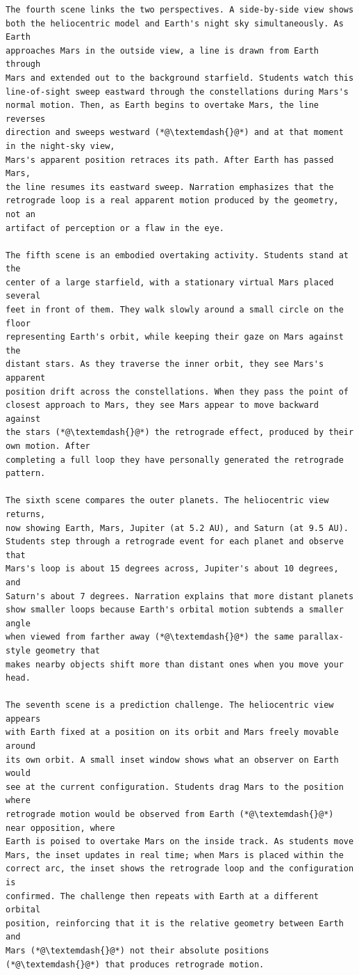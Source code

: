 \begin{lstlisting}[style=arlemlisting, caption={Complete Script-level JSON Lab input for \emph{Apparent Retrograde Motion}: system prompt, then user prompt.}, label={lst:example-prompt}]
The fourth scene links the two perspectives. A side-by-side view shows
both the heliocentric model and Earth's night sky simultaneously. As Earth
approaches Mars in the outside view, a line is drawn from Earth through
Mars and extended out to the background starfield. Students watch this
line-of-sight sweep eastward through the constellations during Mars's
normal motion. Then, as Earth begins to overtake Mars, the line reverses
direction and sweeps westward (*@\textemdash{}@*) and at that moment in the night-sky view,
Mars's apparent position retraces its path. After Earth has passed Mars,
the line resumes its eastward sweep. Narration emphasizes that the
retrograde loop is a real apparent motion produced by the geometry, not an
artifact of perception or a flaw in the eye.

The fifth scene is an embodied overtaking activity. Students stand at the
center of a large starfield, with a stationary virtual Mars placed several
feet in front of them. They walk slowly around a small circle on the floor
representing Earth's orbit, while keeping their gaze on Mars against the
distant stars. As they traverse the inner orbit, they see Mars's apparent
position drift across the constellations. When they pass the point of
closest approach to Mars, they see Mars appear to move backward against
the stars (*@\textemdash{}@*) the retrograde effect, produced by their own motion. After
completing a full loop they have personally generated the retrograde
pattern.

The sixth scene compares the outer planets. The heliocentric view returns,
now showing Earth, Mars, Jupiter (at 5.2 AU), and Saturn (at 9.5 AU).
Students step through a retrograde event for each planet and observe that
Mars's loop is about 15 degrees across, Jupiter's about 10 degrees, and
Saturn's about 7 degrees. Narration explains that more distant planets
show smaller loops because Earth's orbital motion subtends a smaller angle
when viewed from farther away (*@\textemdash{}@*) the same parallax-style geometry that
makes nearby objects shift more than distant ones when you move your head.

The seventh scene is a prediction challenge. The heliocentric view appears
with Earth fixed at a position on its orbit and Mars freely movable around
its own orbit. A small inset window shows what an observer on Earth would
see at the current configuration. Students drag Mars to the position where
retrograde motion would be observed from Earth (*@\textemdash{}@*) near opposition, where
Earth is poised to overtake Mars on the inside track. As students move
Mars, the inset updates in real time; when Mars is placed within the
correct arc, the inset shows the retrograde loop and the configuration is
confirmed. The challenge then repeats with Earth at a different orbital
position, reinforcing that it is the relative geometry between Earth and
Mars (*@\textemdash{}@*) not their absolute positions (*@\textemdash{}@*) that produces retrograde motion.


\end{lstlisting}
